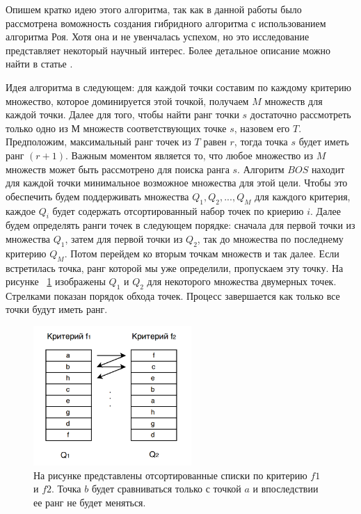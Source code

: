 Опишем кратко идею этого алгоритма, так как в данной работы было рассмотрена воможность создания гибридного алгоритма с использованием алгоритма Роя. Хотя она и не увенчалась успехом, но это исследование представляет некоторый научный интерес. Более детальное описание можно найти в статье \cite{Roy}.

Идея алгоритма в следующем: для каждой точки составим по каждому критерию множество, которое доминируется этой точкой, получаем $M$ множеств для каждой точки. Далее для того, чтобы найти ранг точки $s$ достаточно рассмотреть только одно из $М$ множеств соответствующих точке $s$, назовем его $T$. Предположим, максимальный ранг точек из $T$ равен $r$, тогда точка $s$ будет иметь ранг $(r+1)$. Важным моментом является то, что любое множество из $M$ множеств может быть рассмотрено для поиска ранга $s$. Алгоритм $BOS$ находит для каждой точки минимальное возможное множества для этой цели. Чтобы это обеспечить будем поддерживать множества $Q_1, Q_2, ..., Q_M$ для каждого критерия, каждое $Q_i$ будет содержать отсортированный набор точек по криерию $i$. Далее будем определять ранги точек в следующем порядке: сначала для первой точки из множества $Q_1$, затем для первой точки из $Q_2$, так до множества по последнему критерию $Q_M$. Потом перейдем ко вторым точкам множеств и так далее. Если встретилась точка, ранг которой мы уже определили, пропускаем эту точку. На рисунке ~\ref{bos_descr} изображены $Q_1$ и $Q_2$ для некоторого множества двумерных точек. Стрелками показан порядок обхода точек. Процесс завершается как только все точки будут иметь ранг.

\begin{figure}
\begin{center}
\includegraphics[width=6cm]{pic/bos_pic}
\caption{На рисунке представлены отсортированные списки по критерию $f1$ и $f2$. Точка $b$ будет сравниваться только с точкой $a$ и впоследствии ее ранг не будет меняться.}
\label{bos_descr}
\end{center}
\end{figure}

